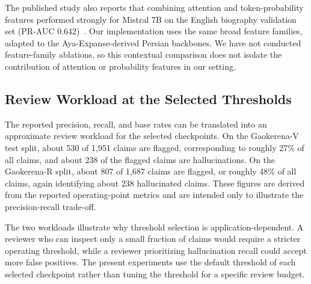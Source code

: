 \documentclass[conference,a4paper]{IEEEtran}
\begin{document}
The published study also reports that combining attention and token-probability features performed strongly for Mistral 7B on the English biography validation set (PR-AUC 0.642)~\cite{b1}. Our implementation uses the same broad feature families, adapted to the Aya-Expanse-derived Persian backbones. We have not conducted feature-family ablations, so this contextual comparison does not isolate the contribution of attention or probability features in our setting.

\subsection{Review Workload at the Selected Thresholds}

The reported precision, recall, and base rates can be translated into an approximate review workload for the selected checkpoints. On the Gaokerena-V test split, about 530 of 1,951 claims are flagged, corresponding to roughly 27\% of all claims, and about 238 of the flagged claims are hallucinations. On the Gaokerena-R split, about 807 of 1,687 claims are flagged, or roughly 48\% of all claims, again identifying about 238 hallucinated claims. These figures are derived from the reported operating-point metrics and are intended only to illustrate the precision-recall trade-off.

The two workloads illustrate why threshold selection is application-dependent. A reviewer who can inspect only a small fraction of claims would require a stricter operating threshold, while a reviewer prioritizing hallucination recall could accept more false positives. The present experiments use the default threshold of each selected checkpoint rather than tuning the threshold for a specific review budget.
\end{document}
